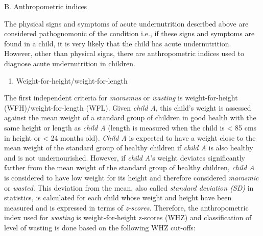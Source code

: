\documentclass[12pt,]{book}
\providecommand{\tightlist}{%
  \setlength{\itemsep}{0pt}\setlength{\parskip}{0pt}}
\theoremstyle{definition}
\theoremstyle{definition}
\theoremstyle{definition}
\theoremstyle{remark}
\begin{document}
B. Anthropometric indices

The physical signs and symptoms of acute undernutrition described above
are considered pathognomonic of the condition i.e., if these signs and
symptoms are found in a child, it is very likely that the child has
acute undernutrition. However, other than physical signs, there are
anthropometric indices used to diagnose acute undernutrition in
children.

\begin{enumerate}
\def\labelenumi{\arabic{enumi}.}
\tightlist
\item
  Weight-for-height/weight-for-length
\end{enumerate}

The first independent criteria for \emph{marasmus} or \emph{wasting} is
weight-for-height (WFH)/weight-for-length (WFL). Given \emph{child A},
this child's weight is assessed against the mean weight of a standard
group of children in good health with the same height or length as
\emph{child A} (length is measured when the child is \textless{} 85 cms
in height or \textless{} 24 months old). \emph{Child A} is expected to
have a weight close to the mean weight of the standard group of healthy
children if \emph{child A} is also healthy and is not undernourished.
However, if \emph{child A}'s weight deviates significantly farther from
the mean weight of the standard group of healthy children, \emph{child
A} is considered to have low weight for its height and therefore
considered \emph{marasmic} or \emph{wasted}. This deviation from the
mean, also called \emph{standard deviation (SD)} in statistics, is
calculated for each child whose weight and height have been measured and
is expressed in terms of \emph{z-scores}. Therefore, the anthropometric
index used for \emph{wasting} is weight-for-height z-scores (WHZ) and
classification of level of wasting is done based on the following WHZ
cut-offs:
\end{document}
